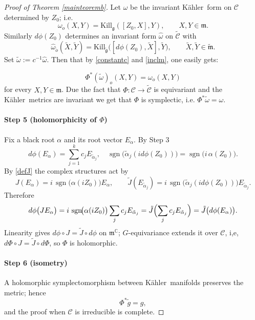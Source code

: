 \documentclass[reqno]{amsart}
\newcommand{\C}{\mathds{C}}
\newcommand{\K}{K\"{a}hler}
\newcommand{\Kill}{{\mathrm{Kill}}}
\begin{document}
\begin{proof}[Proof of Theorem \ref{mainteoremb}]
Let \(\omega\) be the invariant \K\ form on \(\mathcal C\) determined by \(Z_0\); i.e.
\[
\omega_o(X,Y)=\Kill_{\mathfrak{g}}([Z_0,X],Y),\qquad X,Y\in\mathfrak{m}.
\]
Similarly \(d\phi(Z_0)\) determines an invariant form
\(\hat\omega\) on \(\tilde {\mathcal C}\) with
\[
\hat\omega_{\tilde o}(\tilde X,\tilde Y)=
  \Kill_{\tilde{\mathfrak{g}}}\!\bigl([d\phi(Z_0),\tilde X],\tilde Y\bigr),
  \qquad \tilde X,\tilde Y\in\tilde{\mathfrak{m}}.
\]
Set \(\tilde\omega:=c^{-1}\hat\omega\).
Then  that by  \eqref{constantc} and \eqref{inclm},  one easily gets:

\begin{equation}\label{lambdaZU(N)3}
\Phi^*(\tilde \omega)_o(X, Y) = \omega_o(X, Y)
\end{equation}
for every $X, Y \in \mathfrak{m}$.
Due the fact that $\Phi:\mathcal C\to \tilde {\mathcal C}$ is equivariant and 
the \K\ metrics are invariant we get that $\Phi$ is symplectic,
i.e. $\Phi ^*\tilde\omega=\omega$.

\smallskip

\paragraph{\bf Step 5 (holomorphicity of \(\Phi\))}
Fix a black root \(\alpha\) and its root vector \(E_\alpha\).
By Step 3
\[
d\phi(E_\alpha)=\sum_{j=1}^{k} c_j E_{\tilde\alpha_j},
\quad
\operatorname{sgn}\!\bigl(\tilde\alpha_j(i d\phi(Z_0))\bigr)=
\operatorname{sgn}\!\bigl(i\,\alpha(Z_0)\bigr).
\]
By \eqref{defJ} the complex structures act by
\[
J(E_\alpha)=
  i\,\operatorname{sgn}\!\bigl(\alpha(iZ_0)\bigr)E_\alpha,\qquad
\tilde J(E_{\tilde\alpha_j})=
  i\,\operatorname{sgn}\!\bigl(\tilde\alpha_j(i d\phi(Z_0))\bigr)E_{\tilde\alpha_j}.
\]
Therefore
\[
d\phi\bigl(JE_\alpha\bigr)=
  i\,\operatorname{sgn}\!\bigl(\alpha(i Z_0)\bigr)
  \sum_{j} c_j E_{\tilde\alpha_j}
  =\tilde J\Bigl(\sum_{j} c_j E_{\tilde\alpha_j}\Bigr)
  =\tilde J\bigl(d\phi(E_\alpha)\bigr).
\]
Linearity gives $d\phi \circ J=\tilde J\circ d\phi$ on
\(\mathfrak{m}^{\C}\);  $G$-equivariance extends it over \(\mathcal C\),  i,e, 
$d\Phi\circ J=\tilde J\circ d\Phi$, so \(\Phi\) is holomorphic.

\smallskip 

\paragraph{\bf Step 6 (isometry)}
A holomorphic symplectomorphism between \K\  manifolds preserves the metric; hence
\[
\Phi^{*}\tilde g = g,
\]
and the proof  when $\mathcal C$ is irreducible is  complete.


\end{proof}
\end{document}
